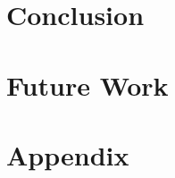 \documentclass[a4paper,english,twoside,11pt]{ifimaster}
\begin{document}
\chapter{Conclusion} \label{cap:conclution}
%

\chapter{Future Work} \label{cap:future}




\backmatter{}
\printbibliography{}


\chapter{Appendix}


%
\end{document}
